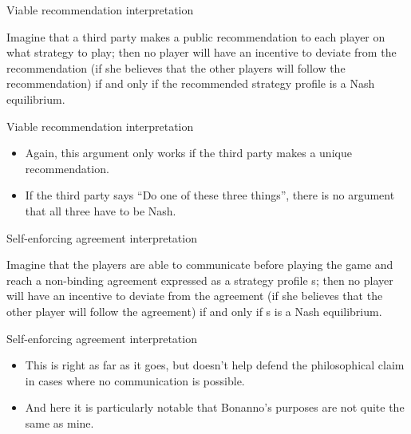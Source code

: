\documentclass[
  14pt,
  letterpaper,
  ignorenonframetext,
  aspectratio=169,
]{beamer}
\providecommand{\tightlist}{%
  \setlength{\itemsep}{0pt}\setlength{\parskip}{0pt}}\usepackage{longtable,booktabs,array}
\renewenvironment*{quote}	
	{\list{}{\rightmargin   \leftmargin} \item } 	
	{\endlist }
\let\olditem\item
\renewcommand{\item}{%
\olditem\vspace{6pt}}
\begin{document}
\begin{frame}{Viable recommendation interpretation}
\protect\hypertarget{viable-recommendation-interpretation}{}
\begin{quote}
Imagine that a third party makes a public recommendation to each player
on what strategy to play; then no player will have an incentive to
deviate from the recommendation (if she believes that the other players
will follow the recommendation) if and only if the recommended strategy
profile is a Nash equilibrium.
\end{quote}
\end{frame}

\begin{frame}{Viable recommendation interpretation}
\protect\hypertarget{viable-recommendation-interpretation-1}{}
\begin{itemize}[<+->]
\tightlist
\item
  Again, this argument only works if the third party makes a unique
  recommendation.
\item
  If the third party says ``Do one of these three things'', there is no
  argument that all three have to be Nash.
\end{itemize}
\end{frame}

\begin{frame}{Self-enforcing agreement interpretation}
\protect\hypertarget{self-enforcing-agreement-interpretation}{}
\begin{quote}
Imagine that the players are able to communicate before playing the game
and reach a non-binding agreement expressed as a strategy profile s;
then no player will have an incentive to deviate from the agreement (if
she believes that the other player will follow the agreement) if and
only if s is a Nash equilibrium.
\end{quote}
\end{frame}

\begin{frame}{Self-enforcing agreement interpretation}
\protect\hypertarget{self-enforcing-agreement-interpretation-1}{}
\begin{itemize}[<+->]
\tightlist
\item
  This is right as far as it goes, but doesn't help defend the
  philosophical claim in cases where no communication is possible.
\item
  And here it is particularly notable that Bonanno's purposes are not
  quite the same as mine.
\end{itemize}
\end{frame}
\end{document}
